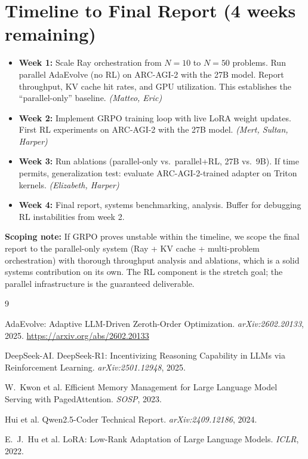 \documentclass{article}
\begin{document}
\section*{Timeline to Final Report (4 weeks remaining)}

\begin{itemize}
    \item \textbf{Week 1:} Scale Ray orchestration from $N=10$ to $N=50$ problems. Run parallel AdaEvolve (no RL) on ARC-AGI-2 with the 27B model. Report throughput, KV cache hit rates, and GPU utilization. This establishes the ``parallel-only'' baseline. \emph{(Matteo, Eric)}
    \item \textbf{Week 2:} Implement GRPO training loop with live LoRA weight updates. First RL experiments on ARC-AGI-2 with the 27B model. \emph{(Mert, Sultan, Harper)}
    \item \textbf{Week 3:} Run ablations (parallel-only vs.\ parallel+RL, 27B vs.\ 9B). If time permits, generalization test: evaluate ARC-AGI-2-trained adapter on Triton kernels. \emph{(Elizabeth, Harper)}
    \item \textbf{Week 4:} Final report, systems benchmarking, analysis. Buffer for debugging RL instabilities from week 2.
\end{itemize}

\textbf{Scoping note:} If GRPO proves unstable within the timeline, we scope the final report to the parallel-only system (Ray + KV cache + multi-problem orchestration) with thorough throughput analysis and ablations, which is a solid systems contribution on its own. The RL component is the stretch goal; the parallel infrastructure is the guaranteed deliverable.


\begin{thebibliography}{9}

AdaEvolve: Adaptive LLM-Driven Zeroth-Order Optimization.
\textit{arXiv:2602.20133}, 2025.
\url{https://arxiv.org/abs/2602.20133}

DeepSeek-AI.
DeepSeek-R1: Incentivizing Reasoning Capability in LLMs via Reinforcement
Learning.
\textit{arXiv:2501.12948}, 2025.

W.~Kwon et al.
Efficient Memory Management for Large Language Model Serving with
PagedAttention.
\textit{SOSP}, 2023.

Hui et al.
Qwen2.5-Coder Technical Report.
\textit{arXiv:2409.12186}, 2024.

E.~J.~Hu et al.
LoRA: Low-Rank Adaptation of Large Language Models.
\textit{ICLR}, 2022.

\end{thebibliography}
\end{document}
